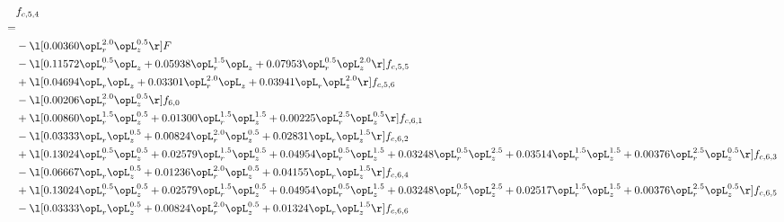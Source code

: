 \begin{alignat}{2} 
\label{eq:f_54_2} 
& f_{c,5,4} \nonumber \\ 
 = \\ 
& - \l[  0.00360 \opL_r^{2.0} \opL_z^{0.5}  \r] F \nonumber \\ 
& - \l[  0.11572 \opL_r^{0.5} \opL_z +  0.05938 \opL_r^{1.5} \opL_z +  0.07953 \opL_r^{0.5} \opL_z^{2.0}  \r] f_{c,5,5} \nonumber \\ 
& + \l[  0.04694 \opL_r \opL_z +  0.03301 \opL_r^{2.0} \opL_z +  0.03941 \opL_r \opL_z^{2.0}  \r] f_{c,5,6} \nonumber \\ 
& - \l[  0.00206 \opL_r^{2.0} \opL_z^{0.5}  \r] f_{6,0} \nonumber \\ 
& + \l[  0.00860 \opL_r^{1.5} \opL_z^{0.5} +  0.01300 \opL_r^{1.5} \opL_z^{1.5} +  0.00225 \opL_r^{2.5} \opL_z^{0.5}  \r] f_{c,6,1} \nonumber \\ 
& - \l[  0.03333 \opL_r \opL_z^{0.5} +  0.00824 \opL_r^{2.0} \opL_z^{0.5} +  0.02831 \opL_r \opL_z^{1.5}  \r] f_{c,6,2} \nonumber \\ 
& + \l[  0.13024 \opL_r^{0.5} \opL_z^{0.5} +  0.02579 \opL_r^{1.5} \opL_z^{0.5} +  0.04954 \opL_r^{0.5} \opL_z^{1.5} +  0.03248 \opL_r^{0.5} \opL_z^{2.5} +  0.03514 \opL_r^{1.5} \opL_z^{1.5} +  0.00376 \opL_r^{2.5} \opL_z^{0.5}  \r] f_{c,6,3} \nonumber \\ 
& - \l[  0.06667 \opL_r \opL_z^{0.5} +  0.01236 \opL_r^{2.0} \opL_z^{0.5} +  0.04155 \opL_r \opL_z^{1.5}  \r] f_{c,6,4} \nonumber \\ 
& + \l[  0.13024 \opL_r^{0.5} \opL_z^{0.5} +  0.02579 \opL_r^{1.5} \opL_z^{0.5} +  0.04954 \opL_r^{0.5} \opL_z^{1.5} +  0.03248 \opL_r^{0.5} \opL_z^{2.5} +  0.02517 \opL_r^{1.5} \opL_z^{1.5} +  0.00376 \opL_r^{2.5} \opL_z^{0.5}  \r] f_{c,6,5} \nonumber \\ 
& - \l[  0.03333 \opL_r \opL_z^{0.5} +  0.00824 \opL_r^{2.0} \opL_z^{0.5} +  0.01324 \opL_r \opL_z^{1.5}  \r] f_{c,6,6} \nonumber \\ 
\end{alignat} 


